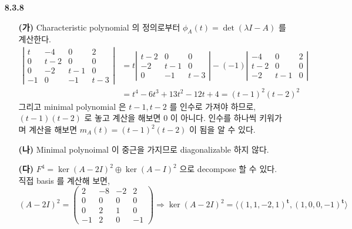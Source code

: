 \documentclass[12pt]{report}
\newcommand*{\trans}{^{\mathrm{\mathbf{t}}}}%
\begin{document}
\begin{itemize}
\item[\textbf{8.3.8}] 
	\begin{itemize}
		\item[\textbf{(가)}] Characteristic polynomial 의 정의로부터 $\phi_A(t) = \det(\lambda I-A)$ 를 계산한다. $$\begin{aligned} \left|\begin{matrix}t& -4&0&2\\0&t-2&0&0\\0&-2&t-1&0\\-1&0&-1&t-3\end{matrix}\right| &= t \left|\begin{matrix}t-2&0&0\\-2&t-1&0\\0&-1&t-3\end{matrix}\right| - (-1) \left|\begin{matrix}-4&0&2\\t-2&0&0\\-2&t-1&0\end{matrix}\right| \\&=t^4-6t^3+13t^2-12t+4 = (t-1)^2(t-2)^2\end{aligned}$$ 그리고 minimal polynomial 은 $t-1, t-2$ 를 인수로 가져야 하므로, $(t-1)(t-2)$ 로 놓고 계산을 해보면 $0$ 이 아니다. 인수를 하나씩 키워가며 계산을 해보면 $m_A(t) = (t-1)^2(t-2)$ 이 됨을 알 수 있다.
		\item[\textbf{(나)}] Minimal polynoimal 이 중근을 가지므로 diagonalizable 하지 않다.
		\item[\textbf{(다)}] $F^4=\ker(A-2I)^2 \oplus \ker (A-I)^2$ 으로 decompose 할 수 있다. 직접 basis 를 계산해 보면, $$(A-2I)^2=\begin{pmatrix}2&-8&-2&2\\0&0&0&0\\0&2&1&0\\-1&2&0&-1\end{pmatrix} \Rightarrow \ker(A-2I)^2 = \langle(1, 1, -2, 1)\trans, (1, 0, 0, -1)\trans\rangle$$

\end{itemize}
\end{itemize}
\end{document}
